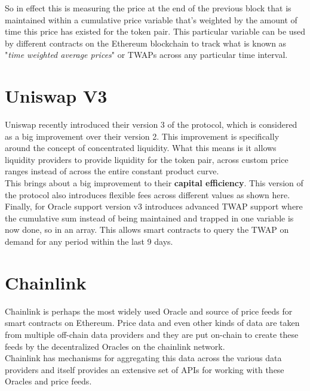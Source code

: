 So in effect this is measuring the price at the end of the previous block that is maintained within a cumulative price variable that's weighted by the amount of time this price has existed for the token pair. This particular variable can be used by different contracts on the Ethereum blockchain to track what is known as "\textit{time weighted average prices}" or TWAPs across any particular time interval.

\section{Uniswap V3}

Uniswap recently introduced their version 3 of the protocol, which is considered as a big improvement over their version 2. This improvement is specifically around the concept of concentrated liquidity. What this means is it allows liquidity providers to provide liquidity for the token pair, across custom price ranges instead of across the entire constant product curve.\\

This brings about a big improvement to their \textbf{capital efficiency}. This version of the protocol also introduces flexible fees across different values as shown here.\\

Finally, for Oracle support version v3 introduces advanced TWAP support where the cumulative sum instead of being maintained and trapped in one variable is now done, so in an array. This allows smart contracts to query the TWAP on demand for any period within the last 9 days.

\section{Chainlink}

Chainlink is perhaps the most widely used Oracle and source of price feeds for smart contracts on Ethereum. Price data and even other kinds of data are taken from multiple off-chain data providers and they are put on-chain to create these feeds by the decentralized Oracles on the chainlink network.\\

Chainlink has mechanisms for aggregating this data across the various data providers and itself provides an extensive set of APIs for working with these Oracles and price feeds.
